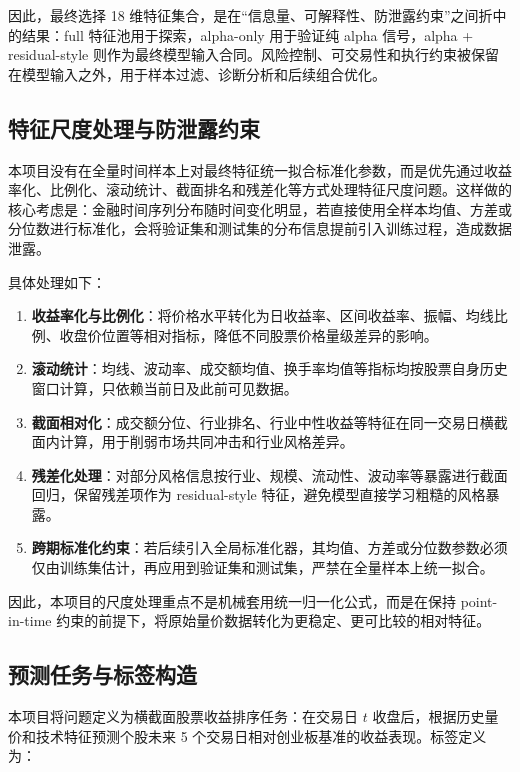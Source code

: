 \documentclass[12pt,a4paper,cn,bibtex]{elegantpaper}
\begin{document}
因此，最终选择 18 维特征集合，是在“信息量、可解释性、防泄露约束”之间折中的结果：full 特征池用于探索，alpha-only 用于验证纯 alpha 信号，alpha + residual-style 则作为最终模型输入合同。风险控制、可交易性和执行约束被保留在模型输入之外，用于样本过滤、诊断分析和后续组合优化。

\subsection{特征尺度处理与防泄露约束}

本项目没有在全量时间样本上对最终特征统一拟合标准化参数，而是优先通过收益率化、比例化、滚动统计、截面排名和残差化等方式处理特征尺度问题。这样做的核心考虑是：金融时间序列分布随时间变化明显，若直接使用全样本均值、方差或分位数进行标准化，会将验证集和测试集的分布信息提前引入训练过程，造成数据泄露。

具体处理如下：

\begin{enumerate}
    \item \textbf{收益率化与比例化}：将价格水平转化为日收益率、区间收益率、振幅、均线比例、收盘价位置等相对指标，降低不同股票价格量级差异的影响。
    \item \textbf{滚动统计}：均线、波动率、成交额均值、换手率均值等指标均按股票自身历史窗口计算，只依赖当前日及此前可见数据。
    \item \textbf{截面相对化}：成交额分位、行业排名、行业中性收益等特征在同一交易日横截面内计算，用于削弱市场共同冲击和行业风格差异。
    \item \textbf{残差化处理}：对部分风格信息按行业、规模、流动性、波动率等暴露进行截面回归，保留残差项作为 residual-style 特征，避免模型直接学习粗糙的风格暴露。
    \item \textbf{跨期标准化约束}：若后续引入全局标准化器，其均值、方差或分位数参数必须仅由训练集估计，再应用到验证集和测试集，严禁在全量样本上统一拟合。
\end{enumerate}

因此，本项目的尺度处理重点不是机械套用统一归一化公式，而是在保持 point-in-time 约束的前提下，将原始量价数据转化为更稳定、更可比较的相对特征。

\subsection{预测任务与标签构造}

本项目将问题定义为横截面股票收益排序任务：在交易日 $t$ 收盘后，根据历史量价和技术特征预测个股未来 5 个交易日相对创业板基准的收益表现。标签定义为：
\end{document}
